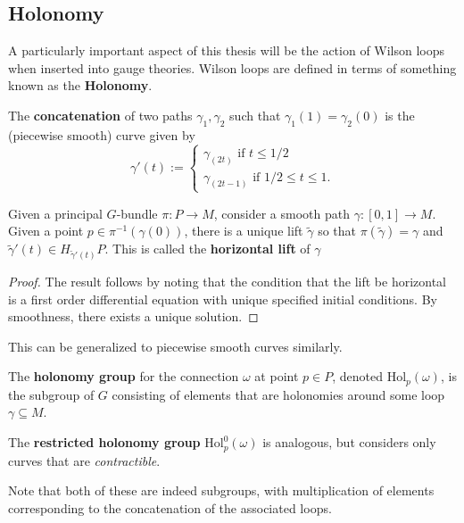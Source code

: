 		\subsection{Holonomy} %
		\label{sub:holonomy}
		
		
		A particularly important aspect of this thesis will be the action of Wilson loops when inserted into gauge theories. Wilson loops are defined in terms of something known as the \textbf{Holonomy}.
		
		The \textbf{concatenation} of two paths $\gamma_1, \gamma_2$ such that $\gamma_1(1) = \gamma_2(0)$ is the (piecewise smooth) curve given by
		\[
			\gamma'(t) := \begin{cases}
				\gamma_(2t)\text{ if } t \leq 1/2\\
				\gamma_(2t-1) \text{ if } 1/2 \leq t \leq 1.
			\end{cases}
		\]
		
		\begin{prop}
			Given a principal $G$-bundle $\pi:P\to M$, consider a smooth path $\gamma: [0, 1] \to M$. Given a point $p \in \pi^{-1}(\gamma(0))$, there is a unique lift $\tilde \gamma$ so that $\pi(\tilde \gamma) = \gamma$ and $\tilde \gamma'(t) \in H_{\tilde \gamma'(t)}P$. This is called the \textbf{horizontal lift} of $\gamma$
		\end{prop}
		\begin{proof}
			The result follows by noting that the condition that the lift be horizontal is a first order differential equation with unique specified initial conditions. By smoothness, there exists a unique solution.
		\end{proof}
		
		This can be generalized to piecewise smooth curves similarly.
		
		\begin{defn}
			The \textbf{holonomy group} for the connection $\omega$ at point $p \in P$, denoted $\mathrm{Hol}_p(\omega)$,  is the subgroup of $G$ consisting of elements that are holonomies around some loop $\gamma \subseteq M$.
			
			The \textbf{restricted holonomy group} $\mathrm{Hol}_p^0(\omega)$ is analogous, but considers only curves that are \emph{contractible}.
		\end{defn}
		Note that both of these are indeed subgroups, with multiplication of elements corresponding to the concatenation of the associated loops.
		
